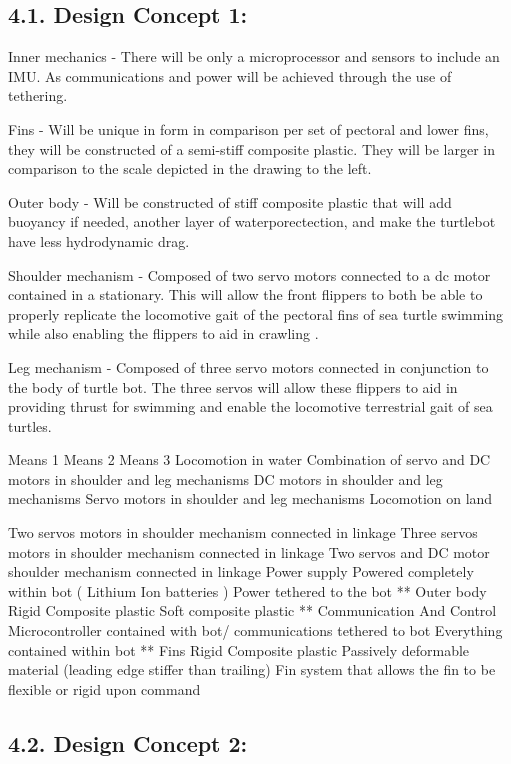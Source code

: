 \documentclass[10pt]{article}
\begin{document}
\subsection{4.1. Design Concept 1:} 
Inner mechanics - There will be only a microprocessor and sensors to include an IMU.  As communications and power will be achieved through the use of tethering. 

Fins - Will be unique in form in comparison per set of pectoral and lower fins, they will be constructed of a semi-stiff composite plastic. They will be larger in comparison to the scale depicted in the drawing to the left. 

Outer body - Will be constructed of stiff composite plastic that will add buoyancy if needed, another layer of waterporectection, and make the turtlebot have less hydrodynamic drag. 

Shoulder mechanism - Composed of two servo motors connected to a dc motor contained in a stationary. This will allow the front flippers to both be able to properly replicate the locomotive  gait of the pectoral fins of sea turtle swimming while also enabling the flippers to aid in crawling .

Leg mechanism - Composed of three servo motors connected in conjunction to the body of turtle bot. The three servos will allow these flippers to aid in providing thrust for swimming and enable the locomotive terrestrial gait of sea turtles.   

Means 1
Means 2
Means 3
Locomotion in water 
Combination of servo and DC motors in shoulder and leg mechanisms 
DC motors in shoulder and leg mechanisms
Servo motors in shoulder and leg mechanisms
Locomotion on land 

Two servos motors in shoulder mechanism connected in linkage 
Three servos motors in shoulder mechanism connected in linkage 
Two servos and DC motor shoulder mechanism connected in linkage 
Power supply 
Powered completely within bot ( Lithium Ion batteries )
Power tethered to the bot 
**
Outer body 
Rigid Composite plastic 
Soft composite plastic
**
Communication
 And Control
Microcontroller contained with bot/ communications tethered to bot
Everything contained within bot 
**
Fins 
Rigid Composite plastic
Passively deformable material (leading edge stiffer than trailing) 
Fin system that allows the fin to be flexible or rigid upon command 

\subsection{4.2. Design Concept 2:}
\end{document}
